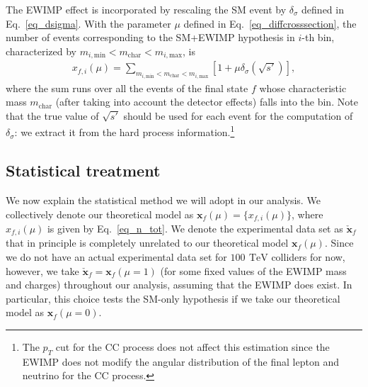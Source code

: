 \documentclass[12pt, a4paper]{article}
\begin{document}
The EWIMP effect is incorporated by rescaling the
SM event by $\delta_\sigma$ defined in Eq.~\eqref{eq_dsigma}.  With the
parameter $\mu$ defined in Eq.~\eqref{eq_diffcrosssection}, the number
of events corresponding to the SM+EWIMP hypothesis in $i$-th bin,
characterized by $m_{i, \mathrm{min}} < m_{\mathrm{char}} < m_{i, \mathrm{max}}$, is
\begin{align}
  x_{f,i} (\mu) = \sum_{m_{i, \mathrm{min}} < m_{\mathrm{char}} < m_{i, \mathrm{max}}}
  \left[
    1 + \mu \delta_\sigma (\sqrt{s'})
  \right],
  \label{eq_n_tot}
\end{align}
where the sum runs over all the events of the final state $f$ whose characteristic mass
$m_{\mathrm{char}}$ (after taking into account the detector effects)
falls into the bin.  Note that the true value of $\sqrt{s'}$ should be used for
each event for the computation of $\delta_\sigma$:
we extract it from the hard process information.\footnote{
	The $p_T$ cut for the CC process does not affect this estimation
	since the EWIMP does not modify the angular distribution of the
	final lepton and neutrino for the CC process.
}


\subsection{Statistical treatment}
\label{sec_statistical}

We now explain the statistical method we will adopt in our analysis.
We collectively denote our theoretical model as $\bm{x}_f(\mu) = \{
x_{f,i} (\mu) \}$, where $x_{f,i}(\mu)$ is given by
Eq.~\eqref{eq_n_tot}.  We denote the experimental data set as
$\check{\bm{x}}_f$ that in principle is completely unrelated to our
theoretical model $\bm{x}_f(\mu)$.  Since we do not have an actual
experimental data set for $100~\,\mathrm{TeV}$ colliders for now,
however, we take $\check{\bm{x}}_f = \bm{x}_f(\mu = 1)$ (for some
fixed values of the EWIMP mass and charges) throughout our analysis,
assuming that the EWIMP does exist.  In particular, this choice tests
the SM-only hypothesis if we take our theoretical model as
$\bm{x}_f(\mu=0)$.
\end{document}
